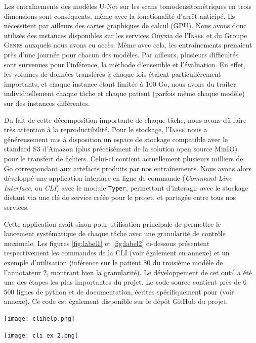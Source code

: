 \documentclass[a4paper,french,bookmarks,12pt]{article}
\begin{document}
    Les entraînements des modèles U-Net sur les scans tomodensitométriques en trois dimensions sont conséquents, même avec la fonctionalité d'arrêt anticipé. Ils nécessitent par ailleurs des cartes graphiques de calcul (GPU). Nous avons donc utilisés des instances disponibles sur les services Onyxia de l'\textsc{Insee} et du Groupe \textsc{Genes} auxquels nous avons eu accès. Même avec cela, les entraînements prenaient près d'une journée pour chacun des modèles.  Par ailleurs, plusieurs difficultés sont survenues pour l'inférence, la méthode d'ensemble et l'évaluation. En effet, les volumes de données transférés à chaque fois étaient particulièrement importants, et chaque instance étant limitée à 100 Go, nous avons du traiter individuellement chaque tâche et chaque patient (parfois même chaque modèle) sur des instances différentes.

    Du fait de cette décomposition importante de chaque tâche, nous avons dû faire très attention à la reproductibilité. Pour le stockage, l'\textsc{Insee} nous a généreusement mis à disposition un espace de stockage compatible avec le standard S3 d'Amazon (plus préceisément de la solution open source MinIO) pour le transfert de fichiers. Celui-ci contient actuellement plusieurs milliers de Go correspondant aux artefacts produits par nos entraînements. Nous avons alors développé une application interface en ligne de commande (\emph{Command-Line Interface}, ou \emph{CLI}) avec le module \texttt{Typer}, permettant d'interagir avec le stockage distant via une clé de service créée pour le projet, et partagée entre tous nos services. 
    
    
    Cette application avait sinon pour utilisation principale de permettre le lancement systématique de chaque tâche avec une granularité de contrôle maximale. Les figures \ref{fig:label1} et \ref{fig:label2} ci-dessous présentent respectivement les commandes de la CLI (voir également en annexe) et un exemple d'utilisation (inférence sur le patient 80 du troisième modèle de l'annotateur 2, montrant bien la granularité). Le développement de cet outil a été une des étapes les plus importantes du projet. Le code source contient près de 6 500 lignes de python et de documentation, écrites spécifiquement pour (voir annexe). Ce code est également disponible sur le dépôt GitHub du projet.
    
    \begin{center}
        \texttt{[image: clihelp.png]}
        \label{fig:label1}
    \end{center}
    \bigskip
    \begin{center}
        \texttt{[image: cli ex 2.png]}
        \label{fig:label2}
    \end{center}
\end{document}
